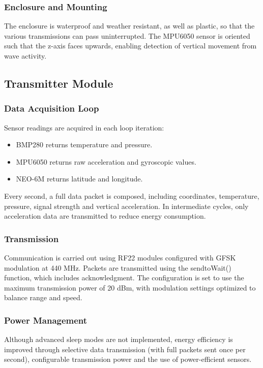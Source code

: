 \documentclass{article}
\begin{document}
    \subsubsection{Enclosure and Mounting}
    The enclosure is waterproof and weather resistant, as well as plastic, so that the various transmissions can pass uninterrupted. The MPU6050 sensor is oriented such that the z-axis faces upwards, enabling detection of vertical movement from wave activity.
    
\subsection{Transmitter Module}
    \subsubsection{Data Acquisition Loop}
    Sensor readings are acquired in each loop iteration:
    \begin{itemize}
        \item BMP280 returns temperature and pressure.
        \item MPU6050 returns raw acceleration and gyroscopic values.
        \item NEO-6M returns latitude and longitude.
    \end{itemize}
    Every second, a full data packet is composed, including coordinates, temperature, pressure, signal strength and vertical acceleration. In intermediate cycles, only acceleration data are transmitted to reduce energy consumption.
    
    \subsubsection{Transmission}
    Communication is carried out using RF22 modules configured with GFSK modulation at 440 MHz. Packets are transmitted using the sendtoWait() function, which includes acknowledgment. The configuration is set to use the maximum transmission power of 20 dBm, with modulation settings optimized to balance range and speed.
    
    \subsubsection{Power Management}
    Although advanced sleep modes are not implemented, energy efficiency is improved through selective data transmission (with full packets sent once per second), configurable transmission power and the use of power-efficient sensors.
    
\end{document}
